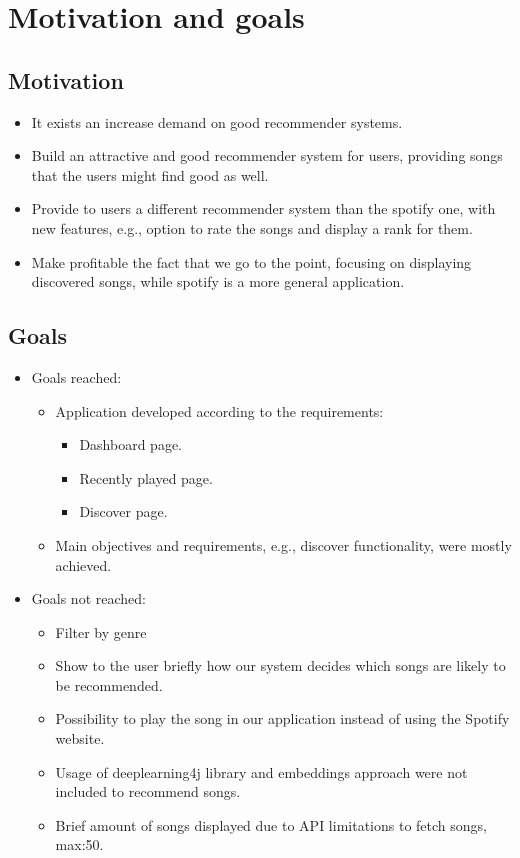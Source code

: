 \chapter{Motivation and goals}

\label{ch:Motivation}

\section{Motivation}
\begin{itemize}
    \item It exists an increase demand on good recommender systems.
    \item Build an attractive and good recommender system for users, providing songs that the users might find good as well.
    \item Provide to users a different recommender system than the spotify one, with new features, e.g., option to rate the songs and display a rank for them.
    \item Make profitable the fact that we go to the point, focusing on displaying discovered songs, while spotify is a more general application.
\end{itemize}

\section{Goals}
\begin{itemize}
    \item Goals reached:
    \begin{itemize}
        \item Application developed according to the requirements:
        \begin{itemize}
            \item Dashboard page.
            \item Recently played page.
            \item Discover page.
        \end{itemize}
        \item Main objectives and requirements, e.g., discover functionality, were mostly achieved. 
    \end{itemize}
    \item Goals not reached:
    \begin{itemize}
        \item Filter by genre
        \item Show to the user briefly how our system decides which songs are likely to be recommended.
        \item Possibility to play the song in our application instead of using the Spotify website.
        \item Usage of deeplearning4j library and embeddings approach were not included to recommend songs.
        \item Brief amount of songs displayed due to API limitations to fetch songs, max:50.
    \end{itemize}
\end{itemize}
\clearpage

